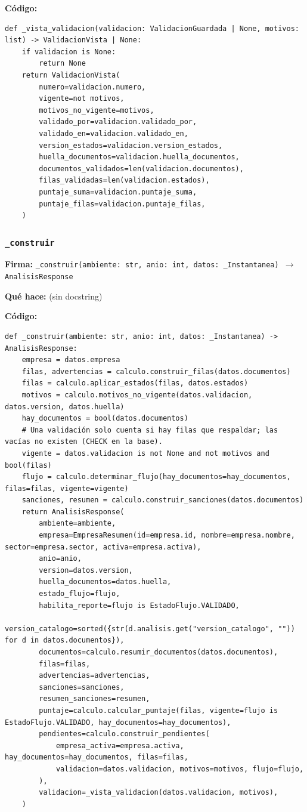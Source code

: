 \documentclass[11pt,a4paper]{article}
\begin{document}
\textbf{Código:}
\begin{lstlisting}
def _vista_validacion(validacion: ValidacionGuardada | None, motivos: list) -> ValidacionVista | None:
    if validacion is None:
        return None
    return ValidacionVista(
        numero=validacion.numero,
        vigente=not motivos,
        motivos_no_vigente=motivos,
        validado_por=validacion.validado_por,
        validado_en=validacion.validado_en,
        version_estados=validacion.version_estados,
        huella_documentos=validacion.huella_documentos,
        documentos_validados=len(validacion.documentos),
        filas_validadas=len(validacion.estados),
        puntaje_suma=validacion.puntaje_suma,
        puntaje_filas=validacion.puntaje_filas,
    )
\end{lstlisting}

\subsubsection*{\texttt{\_construir}}
\textbf{Firma:} \texttt{\_construir(ambiente: str, anio: int, datos: \_Instantanea) $\rightarrow$ AnalisisResponse}

\textbf{Qué hace:} (sin docstring)

\textbf{Código:}
\begin{lstlisting}
def _construir(ambiente: str, anio: int, datos: _Instantanea) -> AnalisisResponse:
    empresa = datos.empresa
    filas, advertencias = calculo.construir_filas(datos.documentos)
    filas = calculo.aplicar_estados(filas, datos.estados)
    motivos = calculo.motivos_no_vigente(datos.validacion, datos.version, datos.huella)
    hay_documentos = bool(datos.documentos)
    # Una validación solo cuenta si hay filas que respaldar; las vacías no existen (CHECK en la base).
    vigente = datos.validacion is not None and not motivos and bool(filas)
    flujo = calculo.determinar_flujo(hay_documentos=hay_documentos, filas=filas, vigente=vigente)
    sanciones, resumen = calculo.construir_sanciones(datos.documentos)
    return AnalisisResponse(
        ambiente=ambiente,
        empresa=EmpresaResumen(id=empresa.id, nombre=empresa.nombre, sector=empresa.sector, activa=empresa.activa),
        anio=anio,
        version=datos.version,
        huella_documentos=datos.huella,
        estado_flujo=flujo,
        habilita_reporte=flujo is EstadoFlujo.VALIDADO,
        version_catalogo=sorted({str(d.analisis.get("version_catalogo", "")) for d in datos.documentos}),
        documentos=calculo.resumir_documentos(datos.documentos),
        filas=filas,
        advertencias=advertencias,
        sanciones=sanciones,
        resumen_sanciones=resumen,
        puntaje=calculo.calcular_puntaje(filas, vigente=flujo is EstadoFlujo.VALIDADO, hay_documentos=hay_documentos),
        pendientes=calculo.construir_pendientes(
            empresa_activa=empresa.activa, hay_documentos=hay_documentos, filas=filas,
            validacion=datos.validacion, motivos=motivos, flujo=flujo,
        ),
        validacion=_vista_validacion(datos.validacion, motivos),
    )
\end{lstlisting}
\end{document}
